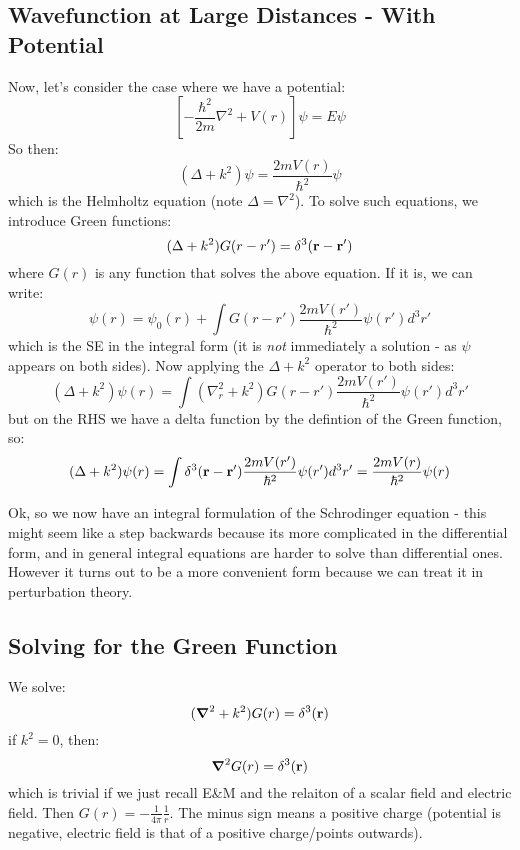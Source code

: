 \subsection{Wavefunction at Large Distances - With Potential}

Now, let's consider the case where we have a potential:
\begin{equation}
    \left[-\frac{\hbar^2}{2m}\nabla^2 + V(r)\right]\psi = E\psi
\end{equation}
So then:
\begin{equation}
    (\Delta + k^2)\psi = \frac{2mV(r)}{\hbar^2}\psi
\end{equation}
which is the Helmholtz equation (note $\Delta = \nabla^2$). To solve such equations, we introduce Green functions:
\begin{equation}
    (\Delta + k^2)G(r - r') = \delta^3(\mathbf{r} - \mathbf{r}')
\end{equation}
where $G(r)$ is any function that solves the above equation. If it is, we can write:
\begin{equation}
    \psi(r) = \psi_0(r) + \int G(r - r')\frac{2mV(r')}{\hbar^2}\psi(r')d^3r'
\end{equation}
which is the SE in the integral form (it is \emph{not} immediately a solution - as $\psi$ appears on both sides).
Now applying the $\Delta + k^2$ operator to both sides:
\begin{equation}
    (\Delta + k^2)\psi(r) = \int (\nabla^2_r + k^2)G(r - r') \frac{2mV(r')}{\hbar^2}\psi(r')d^3r'
\end{equation}
but on the RHS we have a delta function by the defintion of the Green function, so:
\begin{equation}
    (\Delta + k^2)\psi(r) = \int \delta^3(\mathbf{r} - \mathbf{r}') \frac{2mV(r')}{\hbar^2}\psi(r')d^3r' = \frac{2mV(r)}{\hbar^2}\psi(r)
\end{equation}

Ok, so we now have an integral formulation of the Schrodinger equation - this might seem like a step backwards because its more complicated in the differential form, and in general integral equations are harder to solve than differential ones. However it turns out to be a more convenient form because we can treat it in perturbation theory.

\subsection{Solving for the Green Function}
We solve:
\begin{equation}
    (\nabla^2 + k^2)G(r) = \delta^3(\v{r})
\end{equation}
if $k^2 = 0$, then:
\begin{equation}
    \nabla^2 G(r) = \delta^3(\v{r})
\end{equation}
which is trivial if we just recall E\&M and the relaiton of a scalar field and electric field. Then $G(r) = -\frac{1}{4\pi}\frac{1}{r}$. The minus sign means a positive charge (potential is negative, electric field is that of a positive charge/points outwards).

